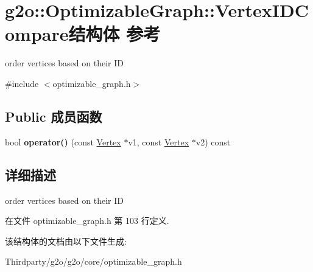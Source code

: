 \hypertarget{structg2o_1_1OptimizableGraph_1_1VertexIDCompare}{\section{g2o\-:\-:Optimizable\-Graph\-:\-:Vertex\-I\-D\-Compare结构体 参考}
\label{structg2o_1_1OptimizableGraph_1_1VertexIDCompare}
}


order vertices based on their I\-D  




{\ttfamily \#include $<$optimizable\-\_\-graph.\-h$>$}

\subsection*{Public 成员函数}
\begin{DoxyCompactItemize}
\item 
\hypertarget{structg2o_1_1OptimizableGraph_1_1VertexIDCompare_a68baebda754c0ce40a550351f95976bc}{bool {\bfseries operator()} (const \hyperlink{classg2o_1_1OptimizableGraph_1_1Vertex}{Vertex} $\ast$v1, const \hyperlink{classg2o_1_1OptimizableGraph_1_1Vertex}{Vertex} $\ast$v2) const }\label{structg2o_1_1OptimizableGraph_1_1VertexIDCompare_a68baebda754c0ce40a550351f95976bc}

\end{DoxyCompactItemize}


\subsection{详细描述}
order vertices based on their I\-D 

在文件 optimizable\-\_\-graph.\-h 第 103 行定义.



该结构体的文档由以下文件生成\-:\begin{DoxyCompactItemize}
\item 
Thirdparty/g2o/g2o/core/optimizable\-\_\-graph.\-h\end{DoxyCompactItemize}
